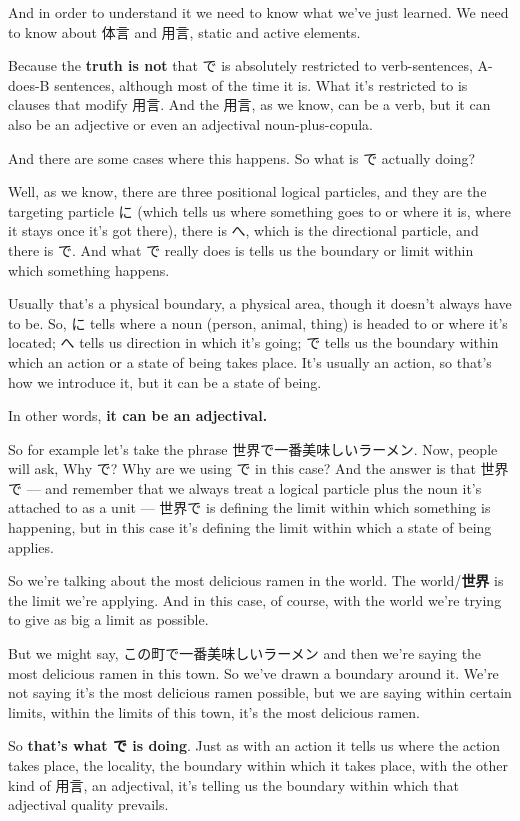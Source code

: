 And in order to understand it we need to know what we've just learned. We need to know about 体言 and 用言, static and active elements.

Because the {\bf truth is not} that で is absolutely restricted to verb-sentences, A-does-B sentences, although most of the time it is. What it's restricted to is clauses that modify 用言. And the 用言, as we know, can be a verb, but it can also be an adjective or even an adjectival noun-plus-copula.

And there are some cases where this happens. So what is で actually doing?

Well, as we know, there are three positional logical particles, and they are the targeting particle に (which tells us where something goes to or where it is, where it stays once it's got there), there is へ, which is the directional particle, and there is で. And what で really does is tells us the boundary or limit within which something happens.

Usually that's a physical boundary, a physical area, though it doesn't always have to be. So, に tells where a noun (person, animal, thing) is headed to or where it's located; へ tells us direction in which it's going; で tells us the boundary within which an action or a state of being takes place. It's usually an action, so that's how we introduce it, but it can be a state of being.

In other words, {\bf it can be an adjectival.}

So for example let's take the phrase 世界で一番美味しいラーメン. Now, people will ask, Why で? Why are we using で in this case? And the answer is that 世界で --- and remember that we always treat a logical particle plus the noun it's attached to as a unit --- 世界で is defining the limit within which something is happening, but in this case it's defining the limit within which a state of being applies.

So we're talking about the most delicious ramen in the world. The world/{\bf 世界} is the limit we're applying. And in this case, of course, with the world we're trying to give as big a limit as possible.

But we might say, この町で一番美味しいラーメン and then we're saying the most delicious ramen in this town. So we've drawn a boundary around it. We're not saying it's the most delicious ramen possible, but we are saying within certain limits, within the limits of this town, it's the most delicious ramen.

So {\bf that's what で is doing}. Just as with an action it tells us where the action takes place, the locality, the boundary within which it takes place, with the other kind of 用言, an adjectival, it's telling us the boundary within which that adjectival quality prevails.

